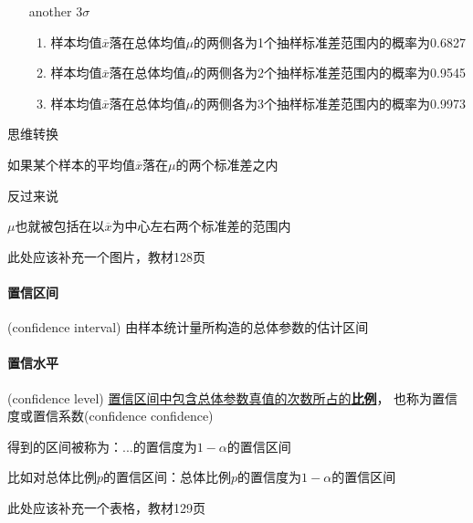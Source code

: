 \documentclass[UTF8,10pt]{book}
\begin{document}
                \begin{itemize}
                    \item [another $3\sigma$] {
                        \begin{enumerate}
                            \item 样本均值$\overline{x}$落在总体均值$\mu$的两侧各为1个抽样标准差范围内的概率为0.6827
                            \item 样本均值$\overline{x}$落在总体均值$\mu$的两侧各为2个抽样标准差范围内的概率为0.9545
                            \item 样本均值$\overline{x}$落在总体均值$\mu$的两侧各为3个抽样标准差范围内的概率为0.9973
                        
                        \end{enumerate}
                    }
                \end{itemize}

                {\kaishu 思维转换

                如果某个样本的平均值$\overline{x}$落在$\mu$的两个标准差之内

                反过来说

                $\mu$也就被包括在以$\overline{x}$为中心左右两个标准差的范围内}

                此处应该补充一个图片，教材128页

            \paragraph{置信区间} (confidence interval) 由样本统计量所构造的总体参数的估计区间

            \paragraph{置信水平} (confidence level) \underline{置信区间中包含总体参数真值的次数所占的\textbf{比例}}，
            也称为置信度或置信系数(confidence confidence)
            
            	得到的区间被称为：...的置信度为$1-\alpha$的置信区间
            	
            	比如对总体比例$p$的置信区间：总体比例$p$的置信度为$1-\alpha$的置信区间

            此处应该补充一个表格，教材129页
            
\end{document}
